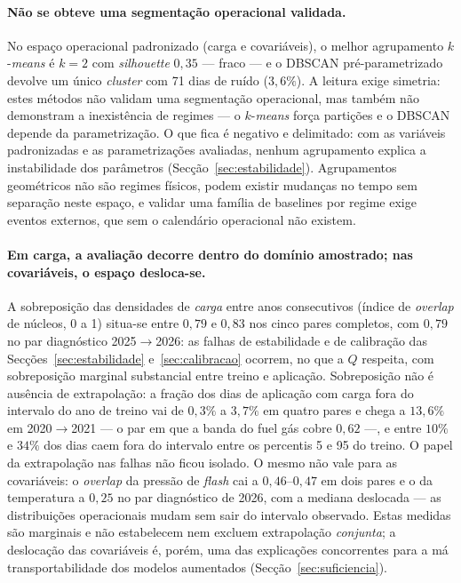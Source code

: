 \paragraph{Não se obteve uma segmentação operacional validada.} No espaço operacional padronizado (carga e covariáveis), o melhor
agrupamento $k$-\emph{means} é $k{=}2$ com \emph{silhouette} $0{,}35$ ---
fraco --- e o DBSCAN pré-parametrizado devolve um único \emph{cluster} com 71
dias de ruído ($3{,}6\%$). A leitura exige simetria: estes métodos não
validam uma segmentação operacional, mas também não demonstram a inexistência
de regimes --- o $k$-\emph{means} força partições e o DBSCAN depende da
parametrização. O que fica é negativo e delimitado: com as variáveis
padronizadas e as parametrizações avaliadas, nenhum agrupamento explica a
instabilidade dos parâmetros (Secção~\ref{sec:estabilidade}). Agrupamentos
geométricos não são regimes físicos, podem existir mudanças no tempo sem
separação neste espaço, e validar uma família de baselines por regime exige
eventos externos, que sem o calendário operacional não existem.

\paragraph{Em carga, a avaliação decorre dentro do domínio amostrado; nas
covariáveis, o espaço desloca-se.} A sobreposição das densidades de
\emph{carga} entre anos consecutivos (índice de \emph{overlap} de núcleos, 0
a 1) situa-se entre $0{,}79$ e $0{,}83$ nos cinco pares completos, com
$0{,}79$ no par diagnóstico 2025${\to}$2026: as falhas de estabilidade e de
calibração das Secções~\ref{sec:estabilidade} e~\ref{sec:calibracao}
ocorrem, no que a $Q$ respeita, com sobreposição marginal substancial entre
treino e aplicação. Sobreposição não é ausência de extrapolação: a fração
dos dias de aplicação com carga fora do intervalo do ano de treino vai de
$0{,}3\%$ a $3{,}7\%$ em quatro pares e chega a $13{,}6\%$ em
2020${\to}$2021 --- o par em que a banda do fuel gás cobre $0{,}62$ ---, e
entre $10\%$ e $34\%$ dos dias caem fora do intervalo entre os percentis 5 e
95 do treino. O papel da extrapolação nas falhas não ficou isolado. O mesmo não vale
para as covariáveis: o \emph{overlap} da pressão de \emph{flash} cai a
$0{,}46$--$0{,}47$ em dois pares e o da temperatura a $0{,}25$ no par
diagnóstico de 2026, com a mediana deslocada --- as distribuições
operacionais mudam sem sair do intervalo observado. Estas medidas são
marginais e não estabelecem nem excluem extrapolação \emph{conjunta}; a
deslocação das covariáveis é, porém, uma das explicações concorrentes para a
má transportabilidade dos modelos aumentados
(Secção~\ref{sec:suficiencia}).

